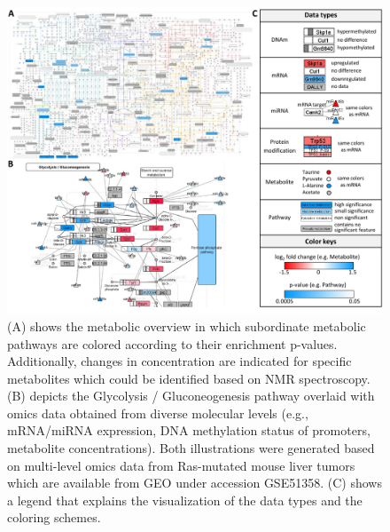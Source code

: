 \documentclass[final,5p,times,twocolumn]{elsarticle}
\newcommand\red[1]{{\color{red}#1}}
\begin{document}
\begin{figure}[t]
\center
\includegraphics[width=1.0\textwidth]{InCroMAP_examples.pdf}
\caption{\red{(A) shows the metabolic overview in which subordinate metabolic pathways are colored according to their enrichment p-values. Additionally, changes in concentration are indicated for specific metabolites which could be identified based on NMR spectroscopy. (B) depicts the Glycolysis / Gluconeogenesis pathway overlaid with omics data obtained from diverse molecular levels (e.g., mRNA/miRNA expression, DNA methylation status of promoters, metabolite concentrations). Both illustrations were generated based on multi-level omics data from Ras-mutated mouse liver tumors which are available from GEO under accession GSE51358.} (C) shows a legend that explains the visualization of the data types and the coloring schemes.}
\label{fig:incromap-examples}
\end{figure}
\end{document}
